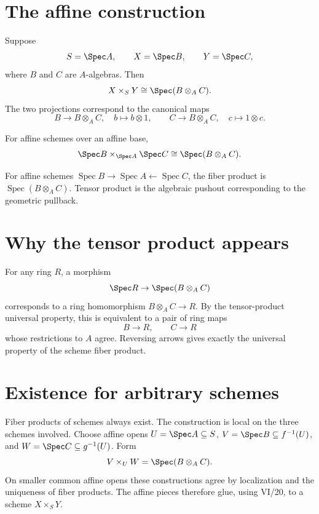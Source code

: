 

\section{The affine construction}
Suppose
\[
S=\Spec A,\qquad X=\Spec B,\qquad Y=\Spec C,
\]
where $B$ and $C$ are $A$-algebras.  Then
\[
X\times_S Y\cong\Spec(B\otimes_A C).
\]
The two projections correspond to the canonical maps
\[
B\longrightarrow B\otimes_A C,\quad b\mapsto b\otimes1,
\qquad
C\longrightarrow B\otimes_A C,\quad c\mapsto1\otimes c.
\]

\begin{theorem}\label{thm:vi23-affine}
For affine schemes over an affine base,
\[
\Spec B\times_{\Spec A}\Spec C\cong\Spec(B\otimes_A C).
\]
\end{theorem}



\begin{example}\label{ex:vi23-expand-01}
For affine schemes $\operatorname{Spec}B\to\operatorname{Spec}A\leftarrow\operatorname{Spec}C$, the fiber product is $\operatorname{Spec}(B\otimes_A C)$.  Tensor product is the algebraic pushout corresponding to the geometric pullback.
\end{example}
\section{Why the tensor product appears}
For any ring $R$, a morphism
\[
\Spec R\to\Spec(B\otimes_A C)
\]
corresponds to a ring homomorphism $B\otimes_A C\to R$.  By the tensor-product universal
property, this is equivalent to a pair of ring maps
\[
B\to R,\qquad C\to R
\]
whose restrictions to $A$ agree.  Reversing arrows gives exactly the universal property of the
scheme fiber product.

\section{Existence for arbitrary schemes}
Fiber products of schemes always exist.  The construction is local on the three schemes involved.
Choose affine opens $U=\Spec A\subseteq S$, $V=\Spec B\subseteq f^{-1}(U)$, and
$W=\Spec C\subseteq g^{-1}(U)$.  Form
\[
V\times_U W=\Spec(B\otimes_A C).
\]
On smaller common affine opens these constructions agree by localization and the uniqueness of
fiber products.  The affine pieces therefore glue, using VI/20, to a scheme $X\times_S Y$.


